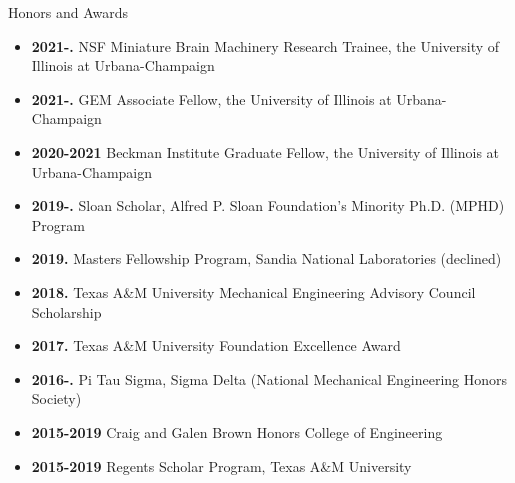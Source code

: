 \documentclass{resume} %
\begin{document}




\begin{rSection}{Honors and Awards}
\begin{itemize}
    \item \textbf{2021-.} NSF Miniature Brain Machinery Research Trainee, the University of Illinois at Urbana-Champaign
    \item \textbf{2021-.} GEM Associate Fellow, the University of Illinois at Urbana-Champaign
    \item \textbf{2020-2021} Beckman Institute Graduate Fellow, the University of Illinois at Urbana-Champaign
    \item \textbf{2019-.} Sloan Scholar, Alfred P. Sloan Foundation's Minority Ph.D. (MPHD) Program
    \item \textbf{2019.} Masters Fellowship Program, Sandia National Laboratories (declined)
    \item \textbf{2018.} Texas A\&M University Mechanical Engineering Advisory Council Scholarship
    \item \textbf{2017.} Texas A\&M University Foundation Excellence Award
    \item \textbf{2016-.} Pi Tau Sigma, Sigma Delta (National Mechanical Engineering Honors Society)
    \item \textbf{2015-2019} Craig and Galen Brown Honors College of Engineering
    \item \textbf{2015-2019} Regents Scholar Program, Texas A\&M University
\end{itemize}
\end{rSection}
\end{document}

